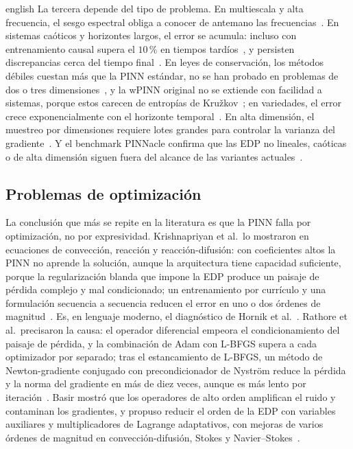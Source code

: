 \documentclass[../0000.tex]{subfiles}
\begin{document}
\begin{hyphenrules}{english}
La tercera depende del tipo de problema. En multiescala y alta frecuencia, el sesgo espectral obliga a conocer de antemano las frecuencias~\cite{wang2021eigenvector}. En sistemas caóticos y horizontes largos, el error se acumula: incluso con entrenamiento causal supera el $10\,\%$ en tiempos tardíos~\cite{wang2022respecting}, y persisten discrepancias cerca del tiempo final~\cite{wang2023expert}. En leyes de conservación, los métodos débiles cuestan más que la PINN estándar, no se han probado en problemas de dos o tres dimensiones~\cite{de2024wpinns,chaumet2024improving}, y la wPINN original no se extiende con facilidad a sistemas, porque estos carecen de entropías de Kružkov~\cite{de2024wpinns}; en variedades, el error crece exponencialmente con el horizonte temporal~\cite{zhou2025weak}. En alta dimensión, el muestreo por dimensiones requiere lotes grandes para controlar la varianza del gradiente~\cite{hu2024tackling}. Y el benchmark PINNacle confirma que las EDP no lineales, caóticas o de alta dimensión siguen fuera del alcance de las variantes actuales~\cite{hao2024pinnacle}.

\subsection{Problemas de optimización}
\label{subsec:ea-opt}

La conclusión que más se repite en la literatura es que la PINN falla por optimización, no por expresividad. Krishnapriyan et al.\ lo mostraron en ecuaciones de convección, reacción y reacción-difusión: con coeficientes altos la PINN no aprende la solución, aunque la arquitectura tiene capacidad suficiente, porque la regularización blanda que impone la EDP produce un paisaje de pérdida complejo y mal condicionado; un entrenamiento por currículo y una formulación secuencia a secuencia reducen el error en uno o dos órdenes de magnitud~\cite{krishnapriyan2021characterizing}. Es, en lenguaje moderno, el diagnóstico de Hornik et al.~\cite{hornik1989multilayer}. Rathore et al.\ precisaron la causa: el operador diferencial empeora el condicionamiento del paisaje de pérdida, y la combinación de Adam con L-BFGS supera a cada optimizador por separado; tras el estancamiento de L-BFGS, un método de Newton-gradiente conjugado con precondicionador de Nyström reduce la pérdida y la norma del gradiente en más de diez veces, aunque es más lento por iteración~\cite{rathore2024challenges}. Basir mostró que los operadores de alto orden amplifican el ruido y contaminan los gradientes, y propuso reducir el orden de la EDP con variables auxiliares y multiplicadores de Lagrange adaptativos, con mejoras de varios órdenes de magnitud en convección-difusión, Stokes y Navier--Stokes~\cite{basir2022investigating}.


\end{hyphenrules}
\end{document}
